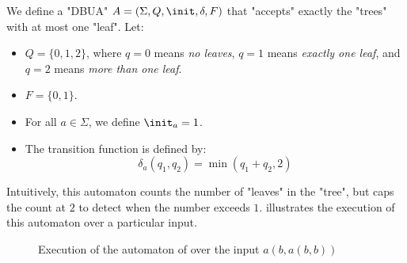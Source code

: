\documentclass[twoside]{article}
\begin{document}
\begin{example}\label{ex:count-leaves}
	We define a "DBUA" $A = (\Sigma, Q, \init, \delta, F)$ that "accepts" exactly the "trees" with at most one "leaf". Let:
	\begin{itemize}
		\item $Q = \{0,1,2\}$, where $q=0$ means \textit{no leaves}, $q=1$ means \textit{exactly one leaf},
		      and $q=2$ means \textit{more than one leaf}.
		\item $F = \{0,1\}$.
		\item For all $a \in \Sigma$, we define $\init_a = 1$.
		\item The transition function is defined by:
		      \[
			      \delta_a(q_1, q_2) = \min(q_1 + q_2, 2)
		      \]
	\end{itemize}

	Intuitively, this automaton counts the number of "leaves" in the "tree", but caps the count at $2$ to detect when the number exceeds $1$.
	 illustrates the execution of this automaton over a particular input.
\end{example}


\begin{figure}[h]\label{fig:count-leaves}
	\centering
	\caption{Execution of the automaton of  over the input $a(b,a(b,b))$}
\end{figure}
\end{document}

